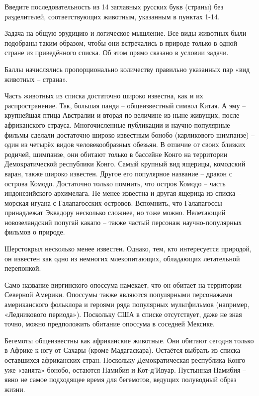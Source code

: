 Введите последовательность из 14 заглавных русских букв (страны) без разделителей, соответствующих животным, указанным в пунктах 1-14. 

\explanationSection

Задача на общую эрудицию и логическое мышление. Все виды животных были подобраны таким образом, чтобы они встречались в природе только в одной стране из приведённого списка. Об этом прямо сказано в условии задачи.

Баллы начислялись пропорционально количеству правильно указанных пар «вид животных – страна».

Часть животных из списка достаточно широко известна, как и их распространение. Так, большая панда – общеизвестный символ Китая. А эму – крупнейшая птица Австралии и вторая по величине из ныне живущих, после африканского страуса. Многочисленные публикации и научно-популярные фильмы сделали достаточно широко известным бонобо (карликового шимпанзе) – один из четырёх видов человекообразных обезьян. В отличие от своих близких родичей, шимпанзе, они обитают только в бассейне Конго на территории Демократической республики Конго. Самый крупный вид ящерицы, комодский варан, также широко известен. Другое его популярное название – дракон с острова Комодо. Достаточно только помнить, что остров Комодо – часть индонезийского архимелага. Не менее известна и другая ящерица из списка – морская игуана с Галапагосских островов. Вспомнить, что Галапагоссы принадлежат Эквадору несколько сложнее, но тоже можно. Нелетающий новозеландский попугай какапо – также частый персонаж научно-популярных фильмов о природе.

Шерстокрыл несколько менее известен. Однако, тем, кто интересуется природой, он известен как одно из немногих млекопитающих, обладающих летательной перепонкой.

Само название виргинского опоссума намекает, что он обитает на территории Северной Америки. Опоссумы также являются популярными персонажами американского фольклора и героями ряда популярных мультфильмов (например, «Ледникового периода»). Поскольку США в списке отсутствует, даже не зная точно, можно предположить обитание опоссума в соседней Мексике.

Бегемоты общеизвестны как африканские животные. Они обитают сегодня только в Африке к югу от Сахары (кроме Мадагаскара). Остаётся выбрать из списка оставшихся африканских стран. Поскольку Демократическая республика Конго уже «занята» бонобо, остаются Намибия и Кот-д’Ивуар. Пустынная Намибия – явно не самое подходящее время для бегемотов, ведущих полуводный образ жизни.

